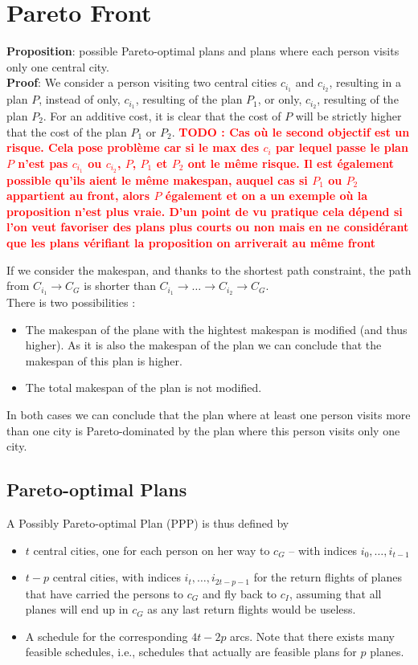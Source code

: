 \documentclass[a4paper,11pt]{article}
\newcommand{\myred}[1]
{\textcolor{red}{\bf {#1}}
}
\begin{document}
\section{Pareto Front}
\noindent
{\bf Proposition}: possible Pareto-optimal plans and plans where each person visits only one central city.\\

{\bf Proof}: We consider a person visiting two central cities $c_{i_1}$ and $c_{i_2}$, resulting in a plan $P$, instead of only, $c_{i_1}$, resulting of the plan $P_1$, or only, $c_{i_2}$, resulting of the plan $P_2$. For an additive cost, it is clear that the cost of $P$ will be strictly higher that the cost of the plan $P_1$ or $P_2$. \myred{TODO : Cas où le second objectif est un risque. Cela pose problème car si le max des $c_i$ par lequel passe le plan $P$ n'est pas $c_{i_1}$ ou $c_{i_2}$, $P$, $P_1$ et $P_2$ ont le même risque. Il est également possible qu'ils aient le même makespan, auquel cas si $P_1$ ou $P_2$ appartient au front, alors $P$ également et on a un exemple où la proposition n'est plus vraie. D'un point de vu pratique cela dépend si l'on veut favoriser des plans plus courts ou non mais en ne considérant que les plans vérifiant la proposition on arriverait au même front}
If we consider the makespan, and thanks to the shortest path constraint, the path from $C_{i_1} \to C_G$ is shorter than $C_{i_1} \to \ldots \to C_{i_2} \to C_G$.\\ There is two possibilities :
\begin{itemize}
\item The makespan of the plane with the hightest makespan is modified (and thus higher). As it is also the makespan of the plan we can conclude that the makespan of this plan is higher.
\item The total makespan of the plan is not modified.
\end{itemize}

In both cases we can conclude that the plan where at least one person visits more than one city is Pareto-dominated by the plan where this person visits only one city.

\subsection{Pareto-optimal Plans}
A Possibly Pareto-optimal Plan (PPP) is thus defined by 
\begin{itemize}
 \item $t$ central cities, one for each person on her way to $c_G$ -- with indices $i_0, \ldots, i_{t-1}$
 \item $t-p$ central cities, with indices $i_{t}, \ldots, i_{2t-p-1}$ for the return flights of planes that have carried the persons to $c_G$ and fly back to $c_I$, assuming that all planes will end up in $c_G$ as any last return flights would be useless. 
 \item A schedule for the corresponding $4t-2p$ arcs. Note that there exists many feasible schedules, i.e., schedules that actually are feasible plans for $p$ planes.
\end{itemize}
\end{document}
